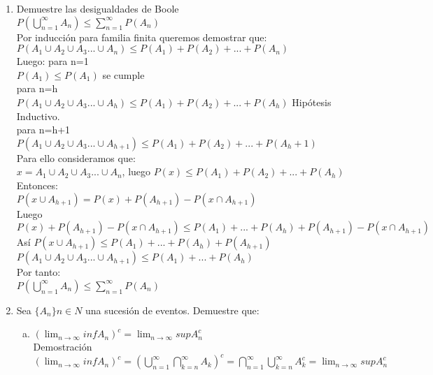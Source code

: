 \documentclass[12pt]{article}
\begin{document}
\begin{enumerate}
\item Demuestre las desigualdades de Boole\\[0.2cm]
$P\left(\displaystyle\bigcup_{n=1}^{\infty}{A_n}\right) \leqslant \displaystyle\sum_{n=1}^{\infty}P\left(A_n\right) $\\[0.2cm]
Por inducción para familia finita queremos demostrar que:\\[0.2cm]
$P\left(A_1\cup A_2\cup A_3...\cup A_n\right) \leqslant P\left(A_1\right)+ P\left(A_2\right)+...+P\left(A_n\right)$	\\[0.2cm]
Luego: para n=1\\[0.2cm]
$P\left(A_1\right)\leqslant P\left(A_1\right) $ se cumple\\[0.2cm]
para n=h\\[0.2cm]
$P\left(A_1\cup A_2\cup A_3...\cup A_h\right)\leqslant P\left(A_1\right)+ P\left(A_2\right)+...+P\left(A_h\right)$ Hipótesis Inductivo.\\[0.2cm]
para n=h+1\\[0.2cm]
$P\left(A_1\cup A_2\cup A_3...\cup A_{h+1}\right)\leqslant P\left(A_1\right)+ P\left(A_2\right)+...+P\left(A_h+1\right)$\\[0.2cm]
Para ello consideramos que:\\[0.2cm]
$x=A_1\cup A_2\cup A_3...\cup A_n$, luego $P\left(x\right) \leqslant P\left(A_1\right)+ P\left(A_2\right)+...+P\left(A_h\right) $\\[0.2cm]
Entonces:\\[0.2cm]
$P\left(x \cup A_{h+1}\right)= P\left(x\right)+P\left(A_{h+1}\right)-P\left(x \cap A_{h+1}\right)$\\[0.2cm]
Luego\\[0.2cm]
$P\left(x\right)+P\left(A_{h+1}\right)-P\left(x \cap A_{h+1}\right)\leqslant P\left(A_1\right)+...+P\left(A_h\right)+P\left(A_{h+1}\right)-P\left(x \cap A_{h+1}\right)$\\[0.2cm]
Así $P\left(x \cup A_{h+1}\right)\leqslant P\left(A_1\right)+...+P\left(A_h\right)+P\left(A_{h+1}\right) $\\[0.2cm]
$P\left(A_1\cup A_2\cup A_3...\cup A_{h+1}\right)\leqslant P\left(A_1\right)+...+P\left(A_h\right)
$\\[0.2cm]
Por tanto:\\[0.2cm]
$P\left(\displaystyle\bigcup_{n=1}^{\infty}{A_n}\right) \leqslant \displaystyle\sum_{n=1}^{\infty}P\left(A_n\right) $


\item Sea $\{A_n\}n \in {N}$ una sucesión de eventos. Demuestre que:
\begin{enumerate}[a)]
\item $\left(\displaystyle\lim_{n\longrightarrow \infty}{inf}A_n\right)^c =\displaystyle\lim_{n\longrightarrow \infty} {sup}{A_n^c} $\\[0.2cm]
Demostración\\[0.2cm]
$\left(\displaystyle\lim_{n\longrightarrow \infty}{inf}A_n\right)^c=\left(\displaystyle\bigcup_{n=1}^{\infty}\displaystyle\bigcap_{k=n}^{\infty}{A_k}\right)^c = \displaystyle\bigcap_{n=1}^{\infty}\displaystyle\bigcup_{k=n}^{\infty}{A_k^c}=\displaystyle\lim_{n\longrightarrow \infty} {sup}{A_n^c}$


\end{enumerate}
\end{enumerate}
\end{document}
